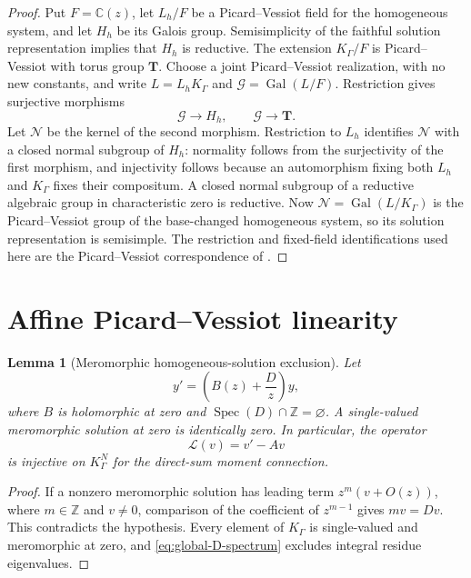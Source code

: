 \documentclass[11pt]{article}
\numberwithin{equation}{section}
\newtheorem{lemma}[lemma]{Lemma}
\theoremstyle{definition}
\theoremstyle{remark}
\newcommand{\C}{\mathbb C}
\newcommand{\Spec}{\operatorname{Spec}}
\begin{document}
\begin{proof}
Put $F=\C(z)$, let $L_h/F$ be a Picard--Vessiot field for the
homogeneous system, and let $H_h$ be its Galois group.  Semisimplicity of
the faithful solution representation implies that $H_h$ is reductive.
The extension $K_\Gamma/F$ is Picard--Vessiot with torus group $\mathbf T$.
Choose a joint Picard--Vessiot realization, with no new constants, and
write $L=L_hK_\Gamma$ and $\mathcal G=\operatorname{Gal}(L/F)$.
Restriction gives surjective morphisms
\[
  \mathcal G\longrightarrow H_h,
  \qquad \mathcal G\longrightarrow\mathbf T.
\]
Let $\mathcal N$ be the kernel of the second morphism.  Restriction to
$L_h$ identifies $\mathcal N$ with a closed normal subgroup of $H_h$:
normality follows from the surjectivity of the first morphism, and
injectivity follows because an automorphism fixing both $L_h$ and
$K_\Gamma$ fixes their compositum.  A closed normal subgroup of a
reductive algebraic group in characteristic zero is reductive.
Now $\mathcal N=\operatorname{Gal}(L/K_\Gamma)$ is the
Picard--Vessiot group of the base-changed homogeneous system, so its
solution representation is semisimple.  The restriction and fixed-field
identifications used here are the Picard--Vessiot correspondence of
\cite[Chapter~1]{vanDerPutSinger}.
\end{proof}

\section{Affine Picard--Vessiot linearity}
\label{sec:affine}

\begin{lemma}[Meromorphic homogeneous-solution exclusion]
\label{lem:meromorphic-exclusion}
Let
\[
  y'=\left(B(z)+\frac Dz\right)y,
\]
where $B$ is holomorphic at zero and
$\Spec(D)\cap\mathbb Z=\varnothing$.  A single-valued meromorphic solution
at zero is identically zero.  In particular, the operator
\[
  \mathscr L(v)=v'-Av
\]
is injective on $K_\Gamma^N$ for the direct-sum moment connection.
\end{lemma}

\begin{proof}
If a nonzero meromorphic solution has leading term
$z^m(v+O(z))$, where $m\in\mathbb Z$ and $v\ne0$, comparison of the
coefficient of $z^{m-1}$ gives $mv=Dv$.  This contradicts the hypothesis.
Every element of $K_\Gamma$ is single-valued and meromorphic at zero, and
\eqref{eq:global-D-spectrum} excludes integral residue eigenvalues.
\end{proof}
\end{document}
